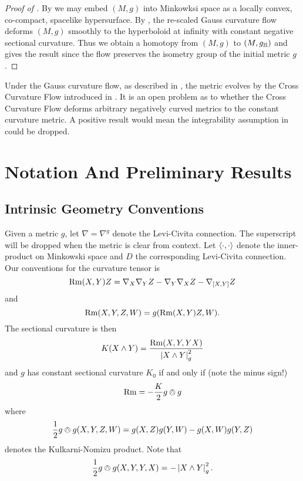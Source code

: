 \documentclass[a4paper, 12pt]{amsart}
\begin{document}
\begin{proof}
[Proof of ]

By  we may embed \((M, g)\) into Minkowksi space as a locally convex, co-compact, spacelike hypersurface. By \cite[Theorem 1.1]{MR3344442}, the re-scaled Gauss curvature flow deforms \((M, g)\) smoothly to the hyperboloid at infinity with constant negative sectional curvature. Thus we obtain a homotopy from \((M, g)\) to \((M, g_{\mathbb{H}})\) and  gives the result since the flow preserves the isometry group of the initial metric \(g\).
\end{proof}

\begin{rem}
Under the Gauss curvature flow, as described in \cite[12. Application to the cross-curvature flow]{MR3344442}, the metric evolves by the Cross Curvature Flow introduced in \cite{MR2055396}. It is an open problem as to whether the Cross Curvature Flow deforms arbitrary negatively curved metrics to the constant curvature metric. A positive result would mean the integrability assumption in  could be dropped.
\end{rem}

\section{Notation And Preliminary Results}
\label{sec:notation}

\subsection{Intrinsic Geometry Conventions}
\label{subsec:notation_intrinsic}

Given a metric \(g\), let \(\nabla = \nabla^g\) denote the Levi-Civita connection. The superscript will be dropped when the metric is clear from context. Let \(\left\langle \cdot,\cdot \right\rangle\) denote the inner-product on Minkowski space and \(D\) the corresponding Levi-Civita connection. Our conventions for the curvature tensor is
\[
\operatorname{Rm}(X, Y) Z = \nabla_X \nabla_Y Z - \nabla_Y \nabla_X Z - \nabla_{[X, Y]} Z
\]
and
\[
\operatorname{Rm}(X, Y, Z, W) = g(\operatorname{Rm}(X, Y) Z, W).
\]
The sectional curvature is then
\[
K(X \wedge Y) = \frac{\operatorname{Rm}(X, Y, Y X)}{\left\lvert{X \wedge Y}\right\rvert_g^2}
\]
and \(g\) has constant sectional curvature \(K_0\) if and only if (note the minus sign!)
\[
\operatorname{Rm} = -\frac{K}{2} g \owedge g
\]
where
\[
\frac{1}{2} g \owedge g (X, Y, Z, W) = g(X, Z) g (Y, W) - g(X, W) g(Y, Z)
\]
denotes the Kulkarni-Nomizu product. Note that
\[
\frac{1}{2} g \owedge g (X, Y, Y, X) = -\left\lvert{X \wedge Y}\right\rvert_g^2.
\]
\end{document}
